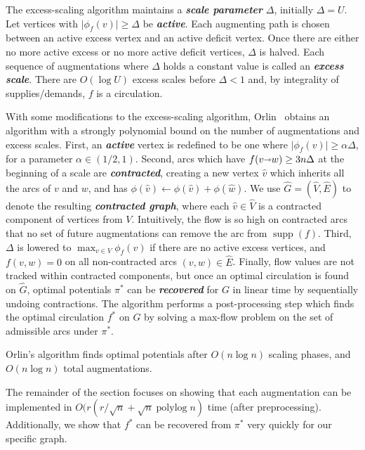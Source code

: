 \documentclass[a4paper,UKenglish]{socg-lipics-v2018}
\def\polylog{\mathop{\mathrm{polylog}}}
\def\abs#1{\mathopen| #1 \mathclose|}		%
\def\fsupply{\phi}
\def\arcto{\mathord\shortrightarrow}
\def\arc#1#2{#1\arcto#2}
\def\supp{\operatorname{supp}}
\theoremstyle{plain}
\numberwithin{figure}{section}
\def\EMPH#1{\textbf{\emph{\boldmath #1}}}
\begin{document}
The excess-scaling algorithm maintains a \EMPH{scale parameter} $\Delta$,
initially $\Delta = U$.
Let vertices with $\abs{\fsupply_f(v)} \geq \Delta$ be \EMPH{active}.
Each augmenting path is chosen between an active excess vertex and an active
deficit vertex.
Once there are either no more active excess or no more active deficit vertices,
$\Delta$ is halved.
Each sequence of augmentations where $\Delta$ holds a constant value is called
an \EMPH{excess scale}.
There are $O(\log U)$ excess scales before $\Delta < 1$ and, by integrality of
supplies/demands, $f$ is a circulation.

With some modifications to the excess-scaling algorithm, Orlin~\cite{O93}
obtains an algorithm with a strongly polynomial bound on the number of
augmentations and excess scales.
First, an \EMPH{active} vertex is redefined to be one where
$\abs{\fsupply_f(v)} \geq \alpha\Delta$, for a parameter $\alpha \in (1/2, 1)$.
Second, arcs which have $f(\arc vw) \geq 3n\Delta$ at the beginning of a scale
are \EMPH{contracted}, creating a new vertex $\hat{v}$ which inherits all the
arcs of $v$ and $w$, and has
$\fsupply(\hat{v}) \gets \fsupply(\hat{v}) + \fsupply(\hat{w})$.
We use $\hat{G} = (\hat{V}, \hat{E})$ to denote the resulting
\EMPH{contracted graph}, where each $\hat{v} \in \hat{V}$ is a contracted
component of vertices from $V$.
Intuitively, the flow is so high on contracted arcs that no set of future
augmentations can remove the arc from $\supp(f)$.
Third, $\Delta$ is lowered to $\max_{v \in V} \fsupply_f(v)$ if there are no
active excess vertices, and $f(v, w) = 0$ on all non-contracted arcs
$(v, w) \in \hat{E}$.
Finally, flow values are not tracked within contracted components, but once an
optimal circulation is found on $\hat{G}$, optimal potentials $\pi^*$ can be
\EMPH{recovered} for $G$ in linear time by sequentially undoing contractions.
The algorithm performs a post-processing step which finds the optimal
circulation $f^*$ on $G$ by solving a max-flow problem on the set of admissible
arcs under $\pi^*$.

\begin{theorem}
\label{theorem:orlin_old}
Orlin's algorithm finds optimal potentials after $O(n\log n)$ scaling phases,
and $O(n\log n)$ total augmentations.
\end{theorem}

The remainder of the section focuses on showing that each augmentation can be
implemented in $O(r(r/\sqrt{n} + \sqrt{n}\polylog n)$ time (after
preprocessing).
Additionally, we show that $f^*$ can be recovered from $\pi^*$ very quickly
for our specific graph.
\end{document}

